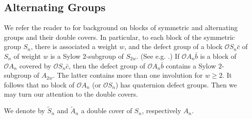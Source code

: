 \documentclass{amsart}
\theoremstyle{plain}\newtheorem{Theorem}{Theorem}[section]
\theoremstyle{plain}\newtheorem{Conjecture}[Theorem]{Conjecture}
\theoremstyle{plain}\newtheorem{Corollary}[Theorem]{Corollary}
\theoremstyle{plain}\newtheorem{Lemma}[Theorem]{Lemma}
\theoremstyle{plain}\newtheorem{Proposition}[Theorem]{Proposition}
\theoremstyle{definition}\newtheorem{Definition}[Theorem]{Definition}
\theoremstyle{definition}\newtheorem{Example}[Theorem]{Example}
\theoremstyle{definition}\newtheorem{Examples}[Theorem]{Examples}
\theoremstyle{definition}\newtheorem{Exercise}[Theorem]{Exercise}
\theoremstyle{definition}\newtheorem{Notation}[Theorem]{Notation}
\theoremstyle{definition}\newtheorem{Remark}[Theorem]{Remark}
\theoremstyle{definition}\newtheorem{Remarks}[Theorem]{Remarks}
\def\CO{{\mathcal{O}}}    \def\OPE{{\mathcal{O}(P\rtimes E)}}
\newcommand{\wt}{\widetilde}
\newcommand{\sym}{{S}}
\newcommand{\alt}{{A}}
\numberwithin{equation}{section}
\begin{document}
\subsection{Alternating Groups} \label{alt}
We refer the reader to \cite[Secs.~11--13]{olsson93} for background on blocks of symmetric and alternating groups and their double covers.
In particular, to each block of the symmetric group $\sym_n$, there is associated a weight $w$, and the defect group of a block $\CO\sym_n\bar{c}$ of $\sym_n$ of weight $w$ is a Sylow $2$-subgroup of $\sym_{2w}$. (See e.g. \cite[Prop.~11.3]{olsson93}.)  
If $\CO\alt_n\bar{b}$ is a block of $\CO\alt_n$ covered by $\CO\sym_n\bar c$, then the defect group of $\CO\alt_n\bar{b}$ contains a Sylow $2$-subgroup of $\alt_{2w}$. The latter contains more than one involution for $w\geq 2$. It follows that no block of $\CO\alt_n$ (or $\CO\sym_n$) has quaternion defect groups. Then we may turn our attention to the double covers.


We denote by $\wt\sym_n$ and $\wt\alt_n$ a double cover of $\sym_n$, respectively $\alt_n$.
\end{document}
